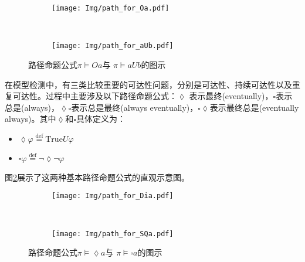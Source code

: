 \begin{figure}[!htbp]
    \centering
    \begin{subfigure}[b]{0.8\textwidth}
        \centering
        \texttt{[image: Img/path\_for\_Oa.pdf]}
    \end{subfigure}
    \\
    \begin{subfigure}{0.8\textwidth}
        \centering
        \texttt{[image: Img/path\_for\_aUb.pdf]}
    \end{subfigure}
    \caption{路径命题公式$\pi\models O a $与 $\pi\models a U b$的图示}
    \label{fig:path-formula-basic}
\end{figure}
在模型检测中，有三类比较重要的可达性问题，分别是可达性、持续可达性以及重复可达性。过程中主要涉及以下路径命题公式：\(\lozenge\) 表示最终(eventually)，\(\square\)表示总是(always)，\(\lozenge\square\)表示总是最终(always eventually)，\(\square\lozenge\)表示最终总是(eventually always)。其中\(\lozenge\)和\(\square\)具体定义为：
\begin{itemize}
    \item \(\lozenge\varphi\overset{\text{def} }{=} \text{True}U\varphi\)
    \item \(\square\varphi\overset{\text{def} }{=} \neg\lozenge\neg\varphi\)
\end{itemize}
图\ref{fig:path-formula}展示了这两种基本路径命题公式的直观示意图。
\begin{figure}[!htbp]
    \centering
    \begin{subfigure}[b]{0.8\textwidth}
        \centering
        \texttt{[image: Img/path\_for\_Dia.pdf]}
    \end{subfigure}
    \\
    \begin{subfigure}{0.8\textwidth}
        \centering
        \texttt{[image: Img/path\_for\_SQa.pdf]}
    \end{subfigure}
    \caption{路径命题公式$\pi\models\lozenge a$与 $\pi\models\square a$的图示}
    \label{fig:path-formula}
\end{figure}

